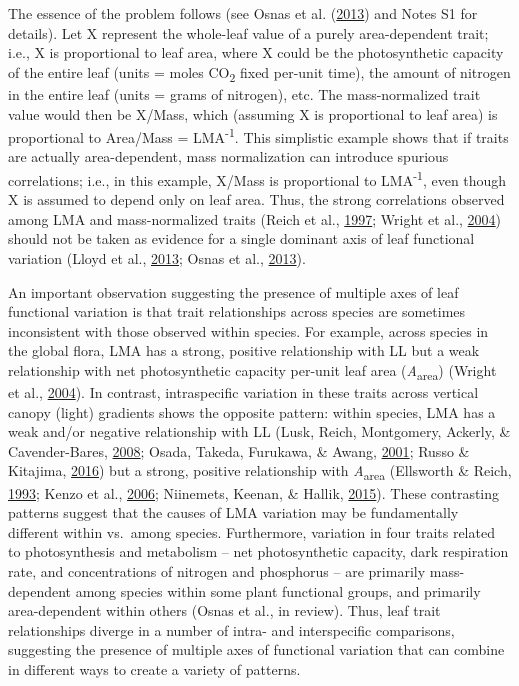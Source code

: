\documentclass[12pt,]{article}
\theoremstyle{definition}
\theoremstyle{definition}
\theoremstyle{definition}
\theoremstyle{remark}
\begin{document}
The essence of the problem follows (see Osnas et al.
(\protect\hyperlink{ref-Osnas2013}{2013}) and Notes S1 for details). Let
X represent the whole-leaf value of a purely area-dependent trait; i.e.,
X is proportional to leaf area, where X could be the photosynthetic
capacity of the entire leaf (units = moles CO\textsubscript{2} fixed
per-unit time), the amount of nitrogen in the entire leaf (units = grams
of nitrogen), etc. The mass-normalized trait value would then be X/Mass,
which (assuming X is proportional to leaf area) is proportional to
Area/Mass = LMA\textsuperscript{-1}. This simplistic example shows that
if traits are actually area-dependent, mass normalization can introduce
spurious correlations; i.e., in this example, X/Mass is proportional to
LMA\textsuperscript{-1}, even though X is assumed to depend only on leaf
area. Thus, the strong correlations observed among LMA and
mass-normalized traits (Reich et al.,
\protect\hyperlink{ref-Reich1997}{1997}; Wright et al.,
\protect\hyperlink{ref-Wright2004}{2004}) should not be taken as
evidence for a single dominant axis of leaf functional variation (Lloyd
et al., \protect\hyperlink{ref-Lloyd2013}{2013}; Osnas et al.,
\protect\hyperlink{ref-Osnas2013}{2013}).

An important observation suggesting the presence of multiple axes of
leaf functional variation is that trait relationships across species are
sometimes inconsistent with those observed within species. For example,
across species in the global flora, LMA has a strong, positive
relationship with LL but a weak relationship with net photosynthetic
capacity per-unit leaf area (\emph{A}\textsubscript{area}) (Wright et
al., \protect\hyperlink{ref-Wright2004}{2004}). In contrast,
intraspecific variation in these traits across vertical canopy (light)
gradients shows the opposite pattern: within species, LMA has a weak
and/or negative relationship with LL (Lusk, Reich, Montgomery, Ackerly,
\& Cavender-Bares, \protect\hyperlink{ref-Lusk2008}{2008}; Osada,
Takeda, Furukawa, \& Awang, \protect\hyperlink{ref-Osada2001}{2001};
Russo \& Kitajima, \protect\hyperlink{ref-Russo2016}{2016}) but a
strong, positive relationship with \emph{A}\textsubscript{area}
(Ellsworth \& Reich, \protect\hyperlink{ref-Ellsworth1993}{1993}; Kenzo
et al., \protect\hyperlink{ref-Kenzo2006}{2006}; Niinemets, Keenan, \&
Hallik, \protect\hyperlink{ref-Niinemets2015}{2015}). These contrasting
patterns suggest that the causes of LMA variation may be fundamentally
different within vs.~among species. Furthermore, variation in four
traits related to photosynthesis and metabolism -- net photosynthetic
capacity, dark respiration rate, and concentrations of nitrogen and
phosphorus -- are primarily mass-dependent among species within some
plant functional groups, and primarily area-dependent within others
(Osnas et al., in review). Thus, leaf trait relationships diverge in a
number of intra- and interspecific comparisons, suggesting the presence
of multiple axes of functional variation that can combine in different
ways to create a variety of patterns.
\end{document}

